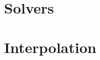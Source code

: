 

\chapter{Solvers}\label{sec:solvers}
   
   

    

   

\chapter{Interpolation}\label{sec:interpolation}


